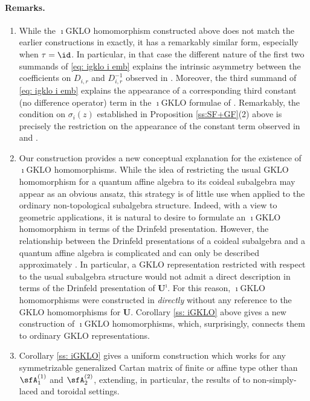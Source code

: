 \documentclass[reqno]{amsart}
\numberwithin{equation}{section}
\newenvironment{remarks}{\medskip\paragraph{{\bf Remarks.} }}{\par\medskip}
\begin{document}
\begin{remarks}
	\hfill
	
	\begin{enumerate}[leftmargin=2em]\itemsep0.25cm
		\item While the $\imath$GKLO homomorphism constructed above does not match the 
		earlier constructions in \cite{LP-gklo, lu-wang-weekes-26} exactly, it has a remarkably 
		similar form, especially when $\tau = \id$. In particular, in that case the different nature 
		of the first two summands of \eqref{eq: igklo i emb} explains the intrinsic asymmetry 
		between the coefficients on $D_{i,r}$ and $D_{i,r}^{-1}$ observed in \cite[Remark 
		3.9]{LP-gklo}. Moreover, the third summand of \eqref{eq: igklo i emb} explains the 
		appearance of a corresponding third constant (no difference operator) term in the 
		$\imath$GKLO formulae of \cite{LP-gklo, lu-wang-weekes-26}. Remarkably, the 
		condition on $\sigma_i(z)$ established in Proposition \ref{ss:SF+GF}(2) above is 
		precisely the restriction on the appearance of the constant term observed in 
		\cite[(3.2)]{LP-gklo} and \cite[(3.2)]{lu-wang-weekes-26}.  
		\item Our construction provides a new conceptual explanation for the existence of 
		$\imath$GKLO homomorphisms. While the idea of restricting the usual GKLO 
		homomorphism for a quantum affine algebra to its coideal subalgebra may appear as an 
		obvious ansatz, this strategy is of little use when applied to the ordinary non-topological 
		subalgebra structure. Indeed, with a view to geometric applications, it is natural to 
		desire to formulate an $\imath$GKLO homomorphism in terms of the Drinfeld 
		presentation. 
		However, the relationship between the Drinfeld presentations of a coideal subalgebra 
		and a quantum affine algebra is complicated and can only be described approximately 
		\cite{Przez-23, li-przezdziecki-25, li-przezdziecki-26}. In particular, a GKLO 
		representation restricted with respect to the usual subalgebra structure would not admit 
		a direct description in terms of the Drinfeld presentation of $\mathbf{U}^\imath$. For 
		this reason, $\imath$GKLO homomorphisms were constructed in \cite{LP-gklo, 
			lu-wang-weekes-26} \emph{directly} without any reference to the GKLO 
		homomorphisms for $\mathbf{U}$. Corollary \ref{ss: iGKLO}  above gives a new 
		construction of $\imath$GKLO homomorphisms, which, surprisingly, connects them 
		to ordinary GKLO representations. 
		\item Corollary \ref{ss: iGKLO} gives a uniform construction which works for any symmetrizable generalized Cartan matrix of finite or affine type other than $\sfA_1^{(1)}$ and $\sfA_2^{(2)}$,
		extending, in particular, the 
		results of \cite{LP-gklo, lu-wang-weekes-26} to non-simply-laced and toroidal settings. 
		\hfill\rmkend
	\end{enumerate}
\end{remarks}
\end{document}

